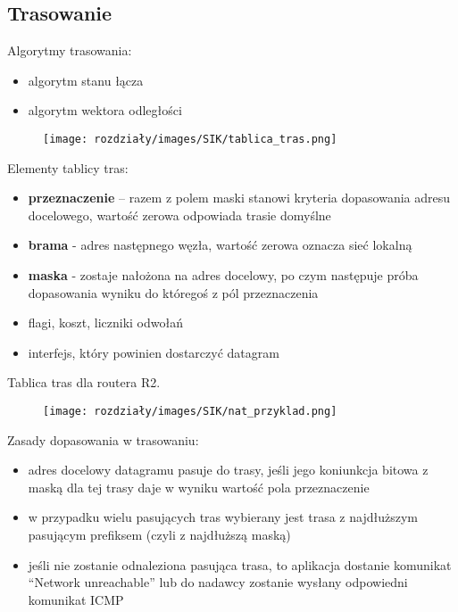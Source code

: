 \subsection{Trasowanie}

Algorytmy trasowania:   
\begin{itemize}
    \item algorytm stanu łącza
    \item algorytm wektora odległości
\end{itemize}

\begin{figure}[H]
    \centering
    \texttt{[image: rozdziały/images/SIK/tablica\_tras.png]}
\end{figure}

Elementy tablicy tras:
\begin{itemize}
    \item \textbf{przeznaczenie} – razem z polem maski stanowi kryteria dopasowania adresu
    docelowego, wartość zerowa odpowiada trasie domyślne
    \item \textbf{brama} - adres następnego węzła, wartość zerowa oznacza sieć lokalną
    \item \textbf{maska} - zostaje nałożona na adres docelowy, po czym następuje próba dopasowania wyniku do któregoś z pól przeznaczenia
    \item flagi, koszt, liczniki odwołań
    \item interfejs, który powinien dostarczyć datagram
\end{itemize}

\begin{example}
    Tablica tras dla routera R2.

    \begin{figure}[H]
    \centering
    \texttt{[image: rozdziały/images/SIK/nat\_przyklad.png]}
\end{figure}
\end{example}

Zasady dopasowania w trasowaniu:
\begin{itemize}
    \item adres docelowy datagramu pasuje do trasy, jeśli jego koniunkcja bitowa z maską dla tej trasy daje w wyniku wartość pola przeznaczenie
    \item w przypadku wielu pasujących tras wybierany jest trasa z najdłuższym pasującym prefiksem (czyli z najdłuższą maską)
    \item jeśli nie zostanie odnaleziona pasująca trasa, to aplikacja dostanie komunikat “Network unreachable” lub do nadawcy zostanie wysłany odpowiedni komunikat ICMP
\end{itemize}

